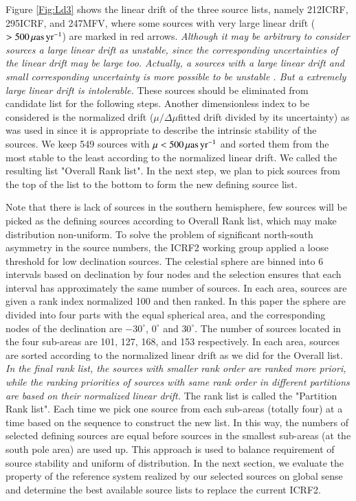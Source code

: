 \documentclass{aa}
\begin{document}
Figure \ref{Fig:Ld3} shows the linear drift of the three source lists, namely 212ICRF, 295ICRF, and 247MFV, where some sources with very large linear drift ($>500\,\rm{\mu as\,yr}^{-1}$) are marked in red arrows. \emph{Although it may be arbitrary to consider sources a large linear drift as unstable, since the corresponding uncertainties of the linear drift may be large too. Actually, a sources with a large linear drift and small corresponding uncertainty is more possible to be unstable \citep{Lambert2009}. But a extremely large linear drift is intolerable.} These sources should be eliminated from candidate list for the following steps. Another dimensionless index to be considered is the normalized drift ($\mu/\Delta\mu$fitted drift divided by its uncertainty) as was used in \citep{Lambert2009} since it is appropriate to describe the intrinsic stability of the sources. We keep 549 sources with $\mu<500\,\rm{\mu as\,yr}^{-1}$ and sorted them from the most stable to the least according to the normalized linear drift. We called the resulting list "Overall Rank list". In the next step, we plan to pick sources from the top of the list to the bottom to form the new defining source list.

Note that there is lack of sources in the southern hemisphere, few sources will be picked as the defining sources according to Overall Rank list, which may make distribution non-uniform. To solve the problem of significant north-south asymmetry in the source numbers, the ICRF2 working group applied a loose threshold for low declination sources. The celestial sphere are binned into 6 intervals based on declination by four nodes and the selection ensures that each interval has approximately the same number of sources. In each area, sources are given a rank index normalized 100 and then ranked. In this paper the sphere are divided into four parts with the equal spherical area, and the corresponding nodes of the declination are $-30^{\circ}$, $0^{\circ}$ and $30^{\circ}$. The number of sources located in the four sub-areas are 101, 127, 168, and 153 respectively. In each area, sources are sorted according to the normalized linear drift as we did for the Overall list. \emph{In the final rank list, the sources with smaller rank order are ranked more priori, while the ranking priorities of sources with same rank order in different partitions are based on their normalized linear drift.} The rank list is called the "Partition Rank list". Each time we pick one source from each sub-areas (totally four) at a time based on the sequence to construct the new list. In this way, the numbers of selected defining sources are equal before sources in the smallest sub-areas (at the south pole area) are used up. This approach is used to balance requirement of source stability and uniform of distribution. In the next section, we evaluate the property of the reference system realized by our selected sources on global sense and determine the best available source lists to replace the current ICRF2.
\end{document}
